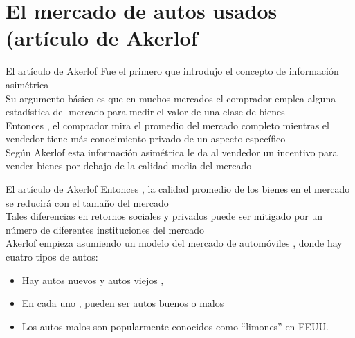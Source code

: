 \section[Akerlof]{El mercado de autos usados (artículo de Akerlof}

\begin{frame}{El artículo de Akerlof}
	Fue el primero que introdujo el concepto de información asimétrica\\[0.3cm]
	Su argumento básico es que en muchos mercados el comprador emplea alguna estadística del mercado para medir el valor de una clase de bienes\\[0.3cm]
	Entonces , el comprador mira el promedio del mercado completo mientras el vendedor tiene más conocimiento privado de un aspecto específico\\[0.3cm]
	Según Akerlof esta información asimétrica le da al vendedor un incentivo para vender bienes por debajo de la calidad media del mercado\\[0.3cm]
	
\end{frame}
\begin{frame}{El artículo de Akerlof}
	Entonces , la calidad promedio de los bienes en el mercado se reducirá con el tamaño del mercado\\[0.3cm]
	Tales diferencias en retornos sociales y privados puede ser mitigado por un número de diferentes instituciones del mercado\\[0.3cm]
	Akerlof empieza asumiendo un modelo del mercado de automóviles , donde hay cuatro tipos de autos:
		\begin{itemize}
			\item Hay autos nuevos y autos viejos ,
			\item En cada uno , pueden ser autos buenos o malos
			\item Los autos malos son popularmente conocidos como ``limones'' en EEUU.
		\end{itemize}

\end{frame}
